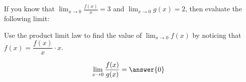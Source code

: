 \documentclass{ximera}
\author{Steven Gubkin \and Bobby Ramsey}
\begin{document}
\begin{exercise}

	If you know that $\lim_{x \to 0} \frac{f(x)}{x} = 3$ and $\lim_{x \to 0} g(x) = 2$, then evaluate the following limit:
	
	\begin{hint}
		Use the product limit law to find the value of $\lim_{x\to 0} f(x)$ by noticing that $f(x) = \dfrac{f(x)}{x} \cdot x$.
	\end{hint}
	
	\[
		\lim_{x \to 0} \frac{f(x)}{g(x)} = \answer{0}
	\]
	
\end{exercise}
\end{document}
